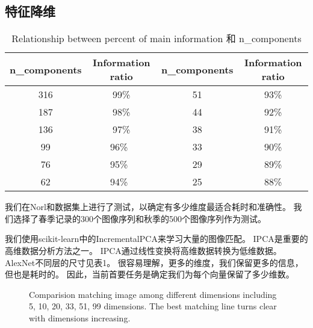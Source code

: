 {\subsection{特征降维}
\begin{table}[!htbp] 
    \caption{Relationship between percent of main information 和 n\_components } 
    \label{tab:component}
    \begin{center} 
        \begin{tabular}{cccc} 
              \toprule
             n\_components&Information ratio& n\_components&Information ratio\\
              \midrule 
              316 & 99\%  & 51  & 93\%\\
              187 & 98\%  & 44  & 92\%\\
              136 & 97\%  & 38  & 91\%\\ 
              99  & 96\%\ & 33  & 90\%\\ 
              76  & 95\%\ & 29  & 89\%\\          
              62  & 94\%\ & 25  & 88\%\\ 
                         \bottomrule 
         \end{tabular} 
     \end{center} 
 \end{table}{}

 我们在Norl和数据集上进行了测试，以确定有多少维度最适合耗时和准确性。 我们选择了春季记录的300个图像序列和秋季的500个图像序列作为测试。 

 我们使用scikit-learn中的IncrementalPCA来学习大量的图像匹配。 IPCA是重要的高维数据分析方法之一。 IPCA通过线性变换将高维数据转换为低维数据。AlexNet不同层的尺寸见表1。 很容易理解，更多的维度，我们保留更多的信息，但也是耗时的。 因此，当前首要任务是确定我们为每个向量保留了多少维数。

\begin{figure}[H]
 \centering
 \caption{ Comparision matching image among different dimensions including 5, 10, 20, 33, 51, 99 dimensions. The best matching line turns clear with dimensions increasing. }
 \label{fig:Matchingcomparision}
\end{figure}

}
